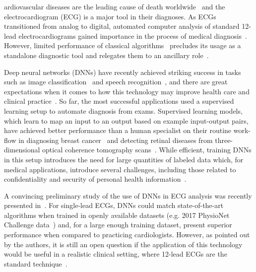 \documentclass{article}
\newcommand{\dropcap}[1]{\lettrine[lines=2,lraise=0.05,findent=0.1em, nindent=0em]{{\dropcapfont{#1}}}{}}
\newcommand{\dropcapfont}{\fontfamily{lmss}\bfseries\fontsize{26pt}{28pt}\selectfont}
\begin{document}
\newpage

\dropcap{C}ardiovascular diseases are the leading cause of death worldwide~\cite{roth_global_2018} and the electrocardiogram (ECG) is a major tool in their diagnoses. As ECGs transitioned from analog to digital, automated computer analysis of standard 12-lead electrocardiograms gained importance in the process of medical diagnosis~\cite{willems_testing_1987, schlapfer_computerinterpreted_2017}. However, limited performance of classical algorithms~\cite{willems_diagnostic_1991, shah_errors_2007} precludes its usage as a standalone diagnostic tool and relegates them to an ancillary role~\cite{estes_computerized_2013, schlapfer_computerinterpreted_2017}.

Deep neural networks (DNNs) have recently achieved striking success in tasks such as image classification~\cite{krizhevsky_imagenet_2012} and speech recognition~\cite{hinton_deep_2012}, and there are great expectations when it comes to how this technology may improve health care and clinical practice~\cite{stead_clinical_2018, naylorc_prospects_2018, hinton_deep_2018}. So far, the most successful applications used a supervised learning setup to automate diagnosis from exams. Supervised learning models, which learn to map an input to an output based on example input-output pairs, have achieved better performance than a human specialist on their routine work-flow in diagnosing breast cancer~\cite{bejnordi_diagnostic_2017} and detecting retinal diseases from three-dimensional optical coherence tomography scans~\cite{defauw_clinically_2018}.  While efficient, training DNNs in this setup introduces the need for large quantities of labeled data which, for medical applications, introduce several challenges, including those related to confidentiality and security of personal health information~\cite{beck_protecting_2016}.

A convincing preliminary study of the use of DNNs in ECG analysis was recently presented in~\cite{hannun_cardiologistlevel_2019}. For single-lead ECGs, DNNs could match state-of-the-art algorithms when trained in openly available datasets (e.g. 2017 PhysioNet Challenge data~\cite{clifford_af_2017}) and, for a large enough training dataset, present superior performance when compared to practicing cardiologists. However, as pointed out by the authors, it is still an open question if the application of this technology would be useful in a realistic clinical setting, where 12-lead ECGs are the standard technique~\cite{hannun_cardiologistlevel_2019}. 
\end{document}
